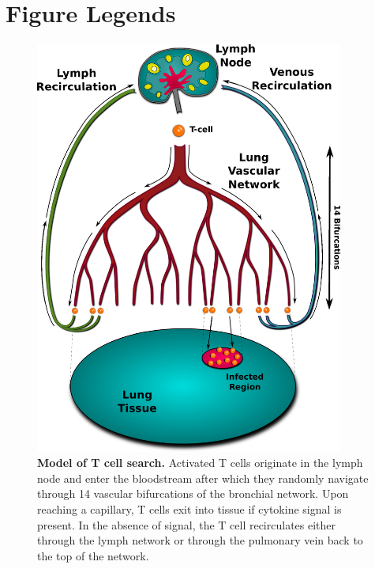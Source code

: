 \documentclass[10pt]{article}
\begin{document}


\section*{Figure Legends}

\begin{figure}[!ht]
\begin{center}
\includegraphics[width=4in]{Figure_1}
\end{center}
\caption{{\bf Model of T cell search.}  Activated T cells originate in the lymph node and enter the bloodstream after which they randomly navigate through 14 vascular bifurcations of the bronchial network.  Upon reaching a capillary, T cells exit into tissue if cytokine signal is present.  In the absence of signal, the T cell recirculates either through the lymph network or through the pulmonary vein back to the top of the network.}
\label{fig:systemchart}
\end{figure}
\end{document}
